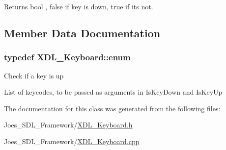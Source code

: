 \begin{DoxyReturn}{Returns}
bool , false if key is down, true if its not. 
\end{DoxyReturn}


\subsection{Member Data Documentation}
\hypertarget{class_x_d_l___keyboard_ac829d3df1d32d9585b5850a16adc683b}{
\subsubsection[{enum}]{\setlength{\rightskip}{0pt plus 5cm}typedef X\-D\-L\-\_\-\-Keyboard\-::enum}}\label{class_x_d_l___keyboard_ac829d3df1d32d9585b5850a16adc683b}
Check if a key is up

List of keycodes, to be passed as arguments in Is\-Key\-Down and Is\-Key\-Up 

The documentation for this class was generated from the following files\-:\begin{DoxyCompactItemize}
\item 
Joes\-\_\-\-S\-D\-L\-\_\-\-Framework/\hyperlink{_x_d_l___keyboard_8h}{X\-D\-L\-\_\-\-Keyboard.\-h}\item 
Joes\-\_\-\-S\-D\-L\-\_\-\-Framework/\hyperlink{_x_d_l___keyboard_8cpp}{X\-D\-L\-\_\-\-Keyboard.\-cpp}\end{DoxyCompactItemize}
